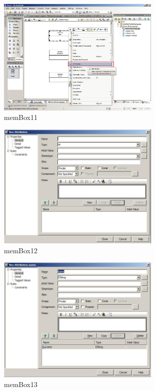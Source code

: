 \begin{figure}[!h]
	\centering
  \includegraphics[width=0.7\textwidth]{pics/memBox11.png}
	\caption{memBox11}
	\label{memBox11}
\end{figure}

\begin{figure}[!h]
	\centering
  \includegraphics[width=0.7\textwidth]{pics/memBox12.png}
	\caption{memBox12}
	\label{memBox12}
\end{figure}

\begin{figure}[!h]
	\centering
  \includegraphics[width=0.7\textwidth]{pics/memBox13.png}
	\caption{memBox13}
	\label{memBox13}
\end{figure}

